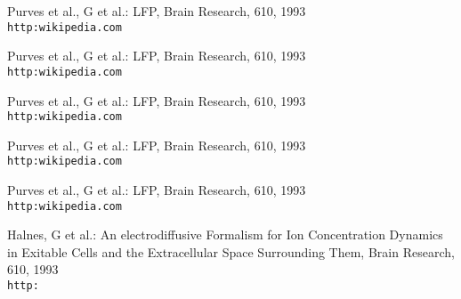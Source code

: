 \documentclass{article}
\begin{document}
\begin{thebibliography}{1}
Purves et al., G et al.: LFP,
Brain Research, 610, 1993
\\\texttt{http:wikipedia.com}

Purves et al., G et al.: LFP,
Brain Research, 610, 1993
\\\texttt{http:wikipedia.com}

Purves et al., G et al.: LFP,
Brain Research, 610, 1993
\\\texttt{http:wikipedia.com}

Purves et al., G et al.: LFP,
Brain Research, 610, 1993
\\\texttt{http:wikipedia.com}

Purves et al., G et al.: LFP,
Brain Research, 610, 1993
\\\texttt{http:wikipedia.com}

Halnes, G et al.: An electrodiffusive Formalism for Ion Concentration Dynamics in Exitable Cells and the Extracellular Space Surrounding Them,
Brain Research, 610, 1993
\\\texttt{http:}


\end{thebibliography}
\end{document}
